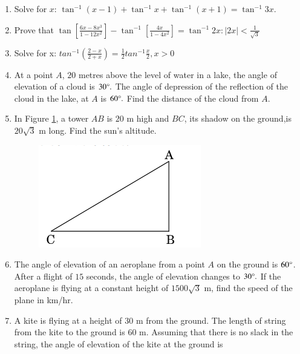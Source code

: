 \begin{enumerate}
\item Solve for $x$: $\tan^{-1}(x-1) + \tan^{-1}x + \tan^{-1}(x+1) = \tan^{-1}3x$.
\hfill{}\item Prove that $\tan[\frac{6x-8x^3}{1-12x^2}]-\tan^{-1}[\frac{4x}{1-4x^2}]=\tan^{-1}2x:|2x|<\frac{1}{\sqrt{3}}$
\hfill{}\item Solve for x: $tan^{-1}(\frac{2-x}{2+x}) = \frac{1}{2} tan^{-1}\frac{x}{2},x>0$
\hfill{}
\item At a point $A$, $20$ metres above the level of water in a lake, the angle of elevation of a cloud is $30 \degree.$ The angle of depression of the reflection of the cloud in the lake, at $A$ is $60\degree .$ Find the distance of the cloud from $A$.
\hfill{}\item In Figure \ref{Figure 1}, a tower $AB$ is $20$ m high and $BC$, its shadow on the ground,is $20\sqrt{3}$ m long. Find the sun's altitude.
\begin{figure}[h!]
	\centering
    \includegraphics[width=\columnwidth]{cbse-math/figs/cbse_30_3_1.png}
	\caption{}
	\label{Figure 1}
\end{figure}
\hfill{}\item The angle of elevation of an aeroplane from a point $A$ on the ground is $60 \degree  $. After a flight of $15$ seconds, the angle of elevation changes to $  30 \degree.$ If the aeroplane is flying at a constant height of $1500\sqrt{3}$ m, find the speed of the plane in km/hr.
\hfill{}
\item A kite is flying at a height of $30 \text{ m}$ from the ground. The length of string from the kite to the ground is $60 \text{ m}$. Assuming that there is no slack in the string, the angle of elevation of the kite at the ground is 

\end{enumerate}
